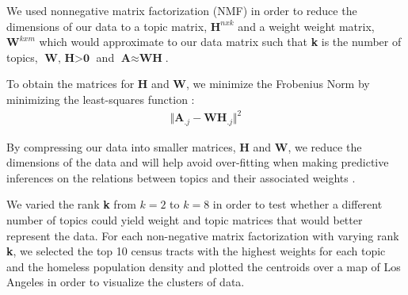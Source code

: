 \documentclass[11pt,letterpaper]{article}
\begin{document}
We used nonnegative matrix factorization (NMF) in order to reduce the dimensions of our data to a topic matrix, $\textbf{H}^{nxk}$  and a weight weight matrix, $\textbf{W}^{kxm} $ which would approximate to our data matrix such that  \textbf{k} is the number of topics, $\textbf{W, H} > \textbf{0}$  and $\textbf{A} \approx \textbf{WH}$.

 To obtain the matrices for \textbf{H} and \textbf{W}, we minimize the Frobenius Norm by minimizing the least-squares function \cite{NIPS2000_1861}:
\begin{align}
\Vert \textbf{A}_{.  j} - \textbf{WH}_{.j} \Vert ^{2}
\end{align}

By compressing our data into smaller matrices, \textbf{H} and \textbf{W}, we reduce the dimensions of the data and will help avoid over-fitting when making predictive inferences on the relations between topics and their associated weights . 

We varied the rank \textbf{k} from $k=2$ to $k = 8$  in order to test whether a different number of topics could yield weight and topic matrices that would better represent the data. For each non-negative matrix factorization with varying rank \textbf{k}, we selected the top 10 census tracts with the highest weights for each topic and the homeless population density and plotted the centroids over a map of Los Angeles in order to visualize the clusters of data.
\end{document}
